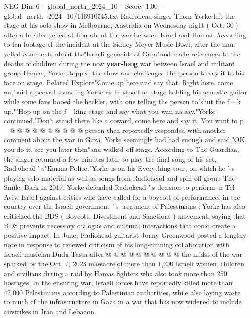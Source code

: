 \begin{textsample}{NEG Dim 6 – global\_north\_2024\_10 – Score -1.00 – global\_north\_2024\_10/116910545.txt}  \label{ex:f6_neg_083}
Radiohead singer Thom Yorke left the stage at his solo show in Melbourne, Australia on Wednesday night ( Oct. 30 ) after a heckler yelled at him about the war between Israel and Hamas.
According to fan footage of the incident at the Sidney Meyer Music Bowl, after the man yelled comments about the"Israeli genocide of Gaza"and made references to the deaths of children during the now \textbf{year-long} war between Israel and militant group Hamas, Yorke stopped the show and challenged the person to say it to his face on stage.
Related Explore"Come up here and say that.
Right here, come on,"said a peeved sounding Yorke as he stood on stage holding his acoustic guitar while some fans booed the heckler, with one telling the person to"shut the f -- k up.""Hop up on the f -- king stage and say what you wan na say,"Yorke continued."Don't stand there like a coward, come here and say it.
You want to p -- @ @ @ @ @ @ @ @ @ @ person then reportedly responded with another comment about the war in Gaza, Yorke seemingly had had enough and said,"OK, you do it, see you later then"and walked off stage.
According to The Guardian, the singer returned a few minutes later to play the final song of his set, Radiohead ' s"Karma Police."Yorke is on his Everything tour, on which he ' s playing solo material as well as songs from Radiohead and spin-off group The Smile.
Back in 2017, Yorke defended Radiohead ' s decision to perform in Tel Aviv, Israel against critics who have called for a boycott of performances in the country over the Israeli government ' s treatment of Palestinians ; Yorke has also criticized the BDS ( Boycott, Divestment and Sanctions ) movement, saying that BDS prevents necessary dialogue and cultural interactions that could create a positive impact.
In June, Radiohead guitarist Jonny Greenwood posted a lengthy note in response to renewed criticism of his long-running collaboration with Israeli musician Dudu Tassa after @ @ @ @ @ @ @ @ @ @ the midst of the war sparked by the Oct. 7, 2023 massacre of more than 1,200 Israeli women, children and civilians during a raid by Hamas fighters who also took more than 250 hostages.
In the ensuring war, Israeli forces have reportedly killed more than 42,000 Palestinians according to Palestinian authorities, while also laying waste to much of the infrastructure in Gaza in a war that has now widened to include airstrikes in Iran and Lebanon.

\end{textsample}
